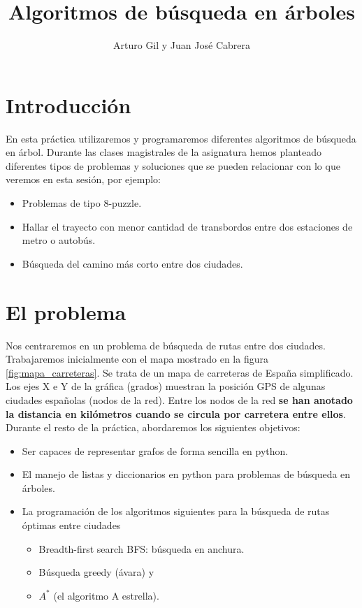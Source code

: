 \documentclass{article}
\title{Algoritmos de búsqueda en árboles}
\author{Arturo Gil y Juan José Cabrera}
\begin{document}
\maketitle

\section{Introducción}
En esta práctica utilizaremos y programaremos diferentes algoritmos de búsqueda en árbol. Durante las clases magistrales de la asignatura hemos planteado diferentes tipos de problemas y soluciones que se pueden relacionar con lo que veremos en esta sesión, por ejemplo:
\begin{itemize}
    \item Problemas de tipo 8-puzzle.
    \item Hallar el trayecto con menor cantidad de transbordos entre dos estaciones de metro o autobús.
    \item Búsqueda del camino más corto entre dos ciudades.
\end{itemize}

\section{El problema}
Nos centraremos en un problema de búsqueda de rutas entre dos ciudades. Trabajaremos inicialmente con el mapa mostrado en la figura \ref{fig:mapa_carreteras}. Se trata de un mapa de carreteras de España simplificado. Los ejes X e Y de la gráfica (grados) muestran la posición GPS de algunas ciudades españolas (nodos de la red). Entre los nodos de la red \textbf{se han anotado la distancia en kilómetros cuando se circula por carretera entre ellos}. Durante el resto de la práctica, abordaremos los siguientes objetivos:
\begin{itemize}
    \item Ser capaces de representar grafos de forma sencilla en python.
    \item El manejo de listas y diccionarios en python para problemas de búsqueda en árboles.
    \item La programación de los algoritmos siguientes para la búsqueda de rutas óptimas entre ciudades
    \begin{itemize}
        \item Breadth-first search BFS: búsqueda en anchura.
        \item Búsqueda greedy (ávara) y
        \item $A^*$ (el algoritmo A estrella). 
    \end{itemize}        
\end{itemize}
\end{document}
